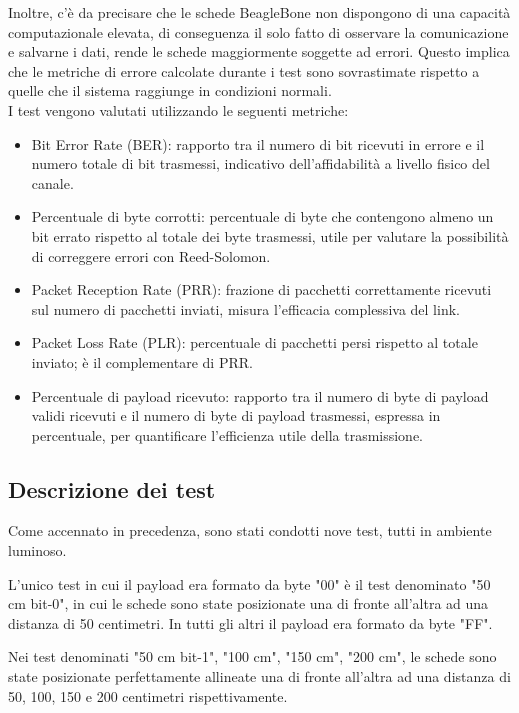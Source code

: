 Inoltre, c'è da precisare che le schede BeagleBone non dispongono di una capacità computazionale elevata, di conseguenza il solo fatto di osservare la comunicazione e salvarne i dati, rende le schede maggiormente soggette ad errori. Questo implica che le metriche di errore calcolate durante i test sono sovrastimate rispetto a quelle che il sistema raggiunge in condizioni normali.\\

\noindent I test vengono valutati utilizzando le seguenti metriche:
\begin{itemize}
    \item Bit Error Rate (BER): rapporto tra il numero di bit ricevuti in errore e il numero totale di bit trasmessi, indicativo dell’affidabilità a livello fisico del canale.
    \item Percentuale di byte corrotti: percentuale di byte che contengono almeno un bit errato rispetto al totale dei byte trasmessi, utile per valutare la possibilità di correggere errori con Reed-Solomon.
    \item Packet Reception Rate (PRR): frazione di pacchetti correttamente ricevuti sul numero di pacchetti inviati, misura l’efficacia complessiva del link.
    \item Packet Loss Rate (PLR): percentuale di pacchetti persi rispetto al totale inviato; è il complementare di PRR.
    \item Percentuale di payload ricevuto: rapporto tra il numero di byte di payload validi ricevuti e il numero di byte di payload trasmessi, espressa in percentuale, per quantificare l’efficienza utile della trasmissione.
\end{itemize}

\subsection{Descrizione dei test}
Come accennato in precedenza, sono stati condotti nove test, tutti in ambiente luminoso.

L'unico test in cui il payload era formato da byte "00" è il test denominato "50 cm bit-0", in cui le schede sono state posizionate una di fronte all'altra ad una distanza di 50 centimetri. In tutti gli altri il payload era formato da byte "FF".

Nei test denominati "50 cm bit-1", "100 cm", "150 cm", "200 cm", le schede sono state posizionate perfettamente allineate una di fronte all'altra ad una distanza di 50, 100, 150 e 200 centimetri rispettivamente.

